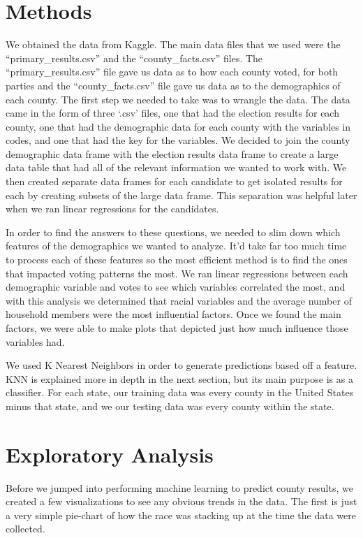 \documentclass[11pt]{article}
\begin{document}
\section*{Methods}
We obtained the data from Kaggle. The main data files that we used were the “primary\_results.csv” and the “county\_facts.csv” files. The “primary\_results.csv” file gave us data as to how each county voted, for both parties and the “county\_facts.csv” file gave us data as to the demographics of each county. 
The first step we needed to take was to wrangle the data. The data came in the form of three ‘.csv’ files, one that had the election results for each county, one that had the demographic data for each county with the variables in codes, and one that had the key for the variables.  We decided to join the county demographic data frame with the election results data frame to create a large data table that had all of the relevant information we wanted to work with. We then created separate data frames for each candidate to get isolated results for each by creating subsets of the large data frame. This separation was helpful later when we ran linear regressions for the candidates.

In order to find the answers to these questions, we needed to slim down which features of the demographics we wanted to analyze. It’d take far too much time to process each of these features so the most efficient method is to find the ones that impacted voting patterns the most. We ran linear regressions between each demographic variable and votes to see which variables correlated the most, and with this analysis we determined that racial variables and the average number of household members were the most influential factors. Once we found the main factors, we were able to make plots that depicted just how much influence those variables had. 

We used K Nearest Neighbors in order to generate predictions based off a feature. KNN is explained more in depth in the next section, but its main purpose is as a classifier. For each state, our training data was every county in the United States minus that state, and we our testing data was every county within the state.

\newpage

\section*{Exploratory Analysis}
Before we jumped into performing machine learning to predict county results, we created a few visualizations to see any obvious trends in the data. The first is just a very simple pie-chart of how the race was stacking up at the time the data were collected. \\
\end{document}

